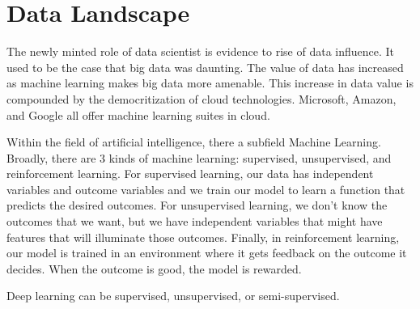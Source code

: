 \section{Data Landscape}

The newly minted role of data scientist is evidence to rise of data influence.
It used to be the case that big data was daunting. The value of data has
increased as machine learning makes big data more amenable. This increase in data value
is compounded by the democritization of cloud technologies. Microsoft, Amazon, and Google
all offer machine learning suites in cloud.



Within the field of artificial intelligence, there a subfield Machine Learning.
Broadly, there are 3 kinds of machine learning: supervised, unsupervised, and
reinforcement learning. For supervised learning, our data has independent
variables and outcome variables and we train our model to learn a function that
predicts the desired outcomes. For unsupervised learning, we don't know the
outcomes that we want, but we have independent variables that might have
features that will illuminate those outcomes. Finally, in reinforcement
learning, our model is trained in an environment where it gets feedback on the
outcome it decides. When the outcome is good, the model is rewarded.

Deep learning can be supervised, unsupervised, or semi-supervised.
